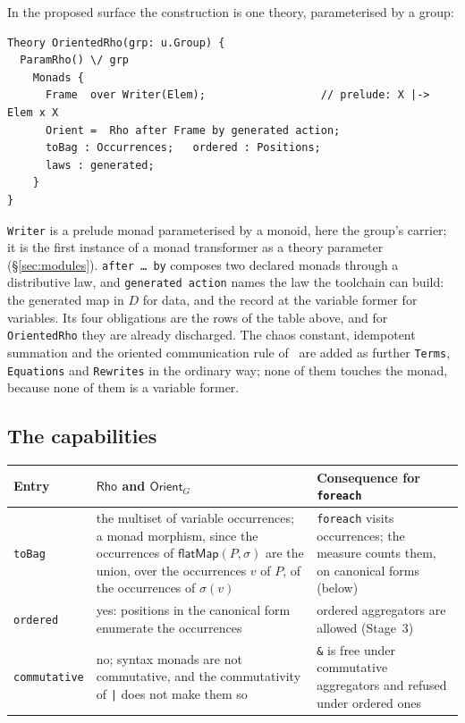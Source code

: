 \documentclass[11pt]{article}
\theoremstyle{definition}
\theoremstyle{plain}
\theoremstyle{remark}
\newcommand{\bind}{\mathsf{flatMap}}
\newcommand{\fe}{\texttt{foreach}}
\begin{document}
In the proposed surface the construction is one theory, parameterised by a
group:
\begin{lstlisting}[language=mettail]
Theory OrientedRho(grp: u.Group) {
  ParamRho() \/ grp
    Monads {
      Frame  over Writer(Elem);                  // prelude: X |-> Elem x X
      Orient =  Rho after Frame by generated action;
      toBag : Occurrences;   ordered : Positions;
      laws : generated;
    }
}
\end{lstlisting}
\texttt{Writer} is a prelude monad parameterised by a monoid, here the group's
carrier; it is the first instance of a monad transformer as a theory parameter
(\S\ref{sec:modules}). \texttt{after \dots{} by} composes two declared monads
through a distributive law, and \texttt{generated action} names the law the
toolchain can build: the generated map in \(D\) for data, and the record at the
variable former for variables. Its four obligations are the rows of the table
above, and for \texttt{OrientedRho} they are already discharged. The chaos
constant, idempotent summation and the oriented communication rule
of~\cite{Oriented} are added as further \texttt{Terms}, \texttt{Equations} and
\texttt{Rewrites} in the ordinary way; none of them touches the monad, because
none of them is a variable former.

\subsection{The capabilities}

\begin{center}
\small
\begin{tabular}{@{}L{0.16\textwidth}L{0.36\textwidth}L{0.38\textwidth}@{}}
\toprule
\textbf{Entry} & \(\mathsf{Rho}\) and \(\mathsf{Orient}_G\) &
\textbf{Consequence for \fe{}} \\
\midrule
\texttt{toBag} & the multiset of variable occurrences; a monad morphism, since
the occurrences of \(\bind(P,\sigma)\) are the union, over the occurrences
\(v\) of \(P\), of the occurrences of \(\sigma(v)\) &
\fe{} visits occurrences; the measure counts them, on canonical forms (below) \\[3pt]
\texttt{ordered} & yes: positions in the canonical form enumerate the
occurrences &
ordered aggregators are allowed (Stage~3) \\[3pt]
\texttt{commutative} & no; syntax monads are not commutative, and the
commutativity of \texttt{|} does not make them so &
\texttt{\&} is free under commutative aggregators and refused under ordered
ones \\
\bottomrule
\end{tabular}
\end{center}
\end{document}
